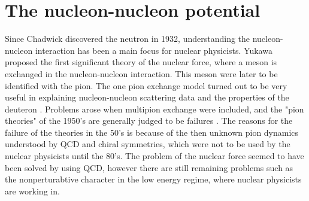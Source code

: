 \chapter{The nucleon-nucleon potential}

Since Chadwick discovered the neutron in 1932, understanding the 
nucleon-nucleon interaction has been a main focus for nuclear physicists.
Yukawa \cite{yukawa35} proposed the first significant theory of the nuclear 
force, where a meson is exchanged in the nucleon-nucleon interaction. This 
meson were later to be identified with the pion. The one pion exchange model
turned out to be very useful in explaining nucleon-nucleon scattering data 
and the properties of the deuteron \cite{machleidt2007}. 
Problems arose when multipion exchange were included, and the "pion 
theories" of the 1950's are generally judged to be failures 
\cite{machleidt2007}. 
The reasons for the failure of the theories in the 50's is because of the
then unknown pion dynamics understood by QCD and chiral symmetries, which were not to be used by the nuclear physicists until the 80's. 
The problem of the nuclear force seemed to have been solved by using QCD, however there are still remaining problems such as the nonperturabtive 
character in the low energy regime, where nuclear physicists are working in.


